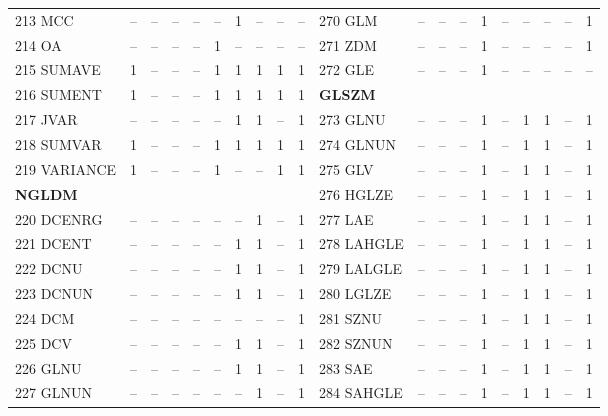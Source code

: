 \documentclass[sn-mathphys,Numbered]{sn-jnl}%
\theoremstyle{thmstyleone}%
\theoremstyle{thmstyletwo}%
\theoremstyle{thmstylethree}%
\begin{document}
\begin{table}[!hbt]
\begin{tiny}
\begin{tabular} { l  c  c  c  c  c  c  c  c  c    l  c  c  c  c  c  c  c  c  c }
 213 MCC & -- &  -- &  -- &  -- &  -- &  1 &  -- & -- & -- &  270 GLM & -- &  -- &  -- &  1 &  -- &  -- &  -- & -- &  1 \\
 214 OA & -- &  -- &  -- &  -- &  1 &  -- &  -- & -- & -- &  271 ZDM & -- &  -- &  -- &  1 &  -- &  -- &  -- & -- &  1 \\
 215 SUMAVE & 1 &  -- &  -- &  -- &  1 &  1 &  1 & 1 & 1 &  272 GLE & -- &  -- &  -- &  1 &  -- &  -- &  -- & -- &  -- \\
 216 SUMENT & 1 &  -- &  -- &  -- &  1 &  1 &  1 & 1 & 1 & \hspace{2mm}  \bf GLSZM \rm  &  &   &   &   &   &   &   &  &   \\
 217 JVAR & -- &  -- &  -- &  -- &  -- &  1 &  1 & -- & 1 &  273 GLNU & -- &  -- &  -- &  1 &  -- &  1 &  1 & -- &  1 \\ %
 218 SUMVAR & 1 &  -- &  -- &  -- &  1 &  1 &  1 & 1 & 1 &  274 GLNUN & -- &  -- &  -- &  1 &  -- &  1 &  1 & -- &  1 \\
 219 VARIANCE & 1 &  -- &  -- &  -- &  1 &  -- &  -- & 1 & 1 &  275 GLV & -- &  -- &  -- &  1 &  -- &  1 &  1 & -- &  1 \\
\hspace{2mm}  \bf NGLDM \rm  &  &   &   &   &   &   &   &  &  &  276 HGLZE & -- &  -- &  -- &  1 &  -- &  1 &  1 & -- &  1 \\ %
 220 DCENRG & -- &  -- &  -- &  -- &  -- &  -- &  1 & -- & 1 &  277 LAE & -- &  -- &  -- &  1 &  -- &  1 &  1 & -- &  1 \\
 221 DCENT & -- &  -- &  -- &  -- &  -- &  1 &  1 & -- & 1 &  278 LAHGLE & -- &  -- &  -- &  1 &  -- &  1 &  1 & -- &  1 \\
 222 DCNU & -- &  -- &  -- &  -- &  -- &  1 &  1 & -- & 1 &  279 LALGLE & -- &  -- &  -- &  1 &  -- &  1 &  1 & -- &  1 \\
 223 DCNUN & -- &  -- &  -- &  -- &  -- &  1 &  1 & -- & 1 &  280 LGLZE & -- &  -- &  -- &  1 &  -- &  1 &  1 & -- &  1 \\
 224 DCM & -- &  -- &  -- &  -- &  -- &  -- &  -- & -- & 1 &  281 SZNU & -- &  -- &  -- &  1 &  -- &  1 &  1 & -- &  1 \\
 225 DCV & -- &  -- &  -- &  -- &  -- &  1 &  1 & -- & 1 &  282 SZNUN & -- &  -- &  -- &  1 &  -- &  1 &  1 & -- &  1 \\
 226 GLNU & -- &  -- &  -- &  -- &  -- &  1 &  1 & -- & 1 &  283 SAE & -- &  -- &  -- &  1 &  -- &  1 &  1 & -- &  1 \\
 227 GLNUN & -- &  -- &  -- &  -- &  -- &  -- &  1 & -- & 1 &  284 SAHGLE & -- &  -- &  -- &  1 &  -- &  1 &  1 & -- &  1 \\

\end{tabular}
\end{tiny}
\end{table}
\end{document}
